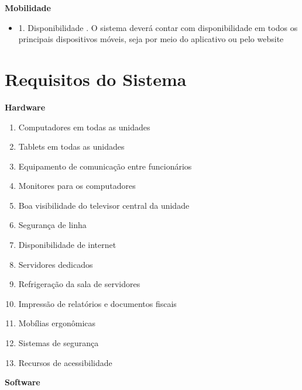 \textbf{Mobilidade}
\begin{itemize}[label={}]
	\item 1. Disponibilidade 
		. O sistema deverá contar com disponibilidade em todos os principais dispositivos móveis, seja por meio do aplicativo ou pelo website 
\end{itemize}
\section{Requisitos do Sistema}
\textbf{Hardware}
\begin{enumerate}
	\item Computadores em todas as unidades
	\item Tablets em todas as unidades
	\item Equipamento de comunicação entre funcionários
	\item Monitores para os computadores
	\item Boa visibilidade do televisor central da unidade
	\item Segurança de linha
	\item Disponibilidade de internet
	\item Servidores dedicados
	\item Refrigeração da sala de servidores
	\item Impressão de relatórios e documentos fiscais
	\item Mobílias ergonômicas
	\item Sistemas de segurança
	\item Recursos de acessibilidade
\end{enumerate}
\textbf{Software}

